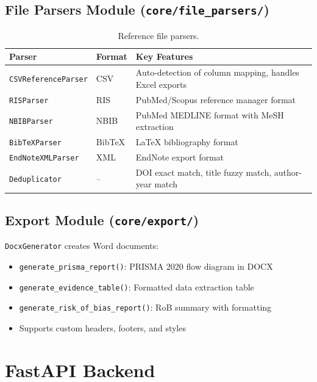 \documentclass[11pt,a4paper]{article}
\begin{document}
\subsection{File Parsers Module (\texttt{core/file\_parsers/})}

\begin{table}[H]
\centering\small
\begin{tabular}{llp{5cm}}
\toprule
\textbf{Parser} & \textbf{Format} & \textbf{Key Features} \\
\midrule
\texttt{CSVReferenceParser} & CSV & Auto-detection of column mapping, handles Excel exports \\
\texttt{RISParser} & RIS & PubMed/Scopus reference manager format \\
\texttt{NBIBParser} & NBIB & PubMed MEDLINE format with MeSH extraction \\
\texttt{BibTeXParser} & BibTeX & LaTeX bibliography format \\
\texttt{EndNoteXMLParser} & XML & EndNote export format \\
\texttt{Deduplicator} & -- & DOI exact match, title fuzzy match, author-year match \\
\bottomrule
\end{tabular}
\caption{Reference file parsers.}
\end{table}

\subsection{Export Module (\texttt{core/export/})}

\texttt{DocxGenerator} creates Word documents:
\begin{itemize}[nosep]
  \item \texttt{generate\_prisma\_report()}: PRISMA 2020 flow diagram in DOCX
  \item \texttt{generate\_evidence\_table()}: Formatted data extraction table
  \item \texttt{generate\_risk\_of\_bias\_report()}: RoB summary with formatting
  \item Supports custom headers, footers, and styles
\end{itemize}

\section{FastAPI Backend}
\end{document}
